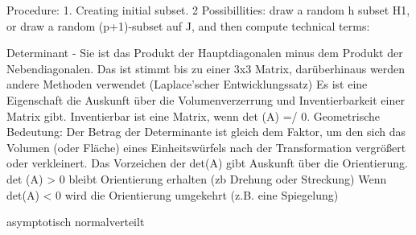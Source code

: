 Procedure: 1. Creating initial subset. 
2 Possibillities: draw a random h subset H1, or draw a random (p+1)-subset auf J, and then compute 
technical terms:


Determinant - Sie ist das Produkt der Hauptdiagonalen minus dem Produkt der Nebendiagonalen. Das ist stimmt bis zu einer 3x3 Matrix, darüberhinaus werden andere Methoden verwendet (Laplace'scher Entwicklungssatz)
Es ist eine Eigenschaft die Auskunft über die Volumenverzerrung und Inventierbarkeit einer Matrix gibt. 
Inventierbar ist eine Matrix, wenn det (A) =/ 0. 
Geometrische Bedeutung:  Der Betrag der Determinante ist gleich dem Faktor, um den sich das Volumen (oder Fläche)  eines Einheitswürfels nach der Transformation vergrößert oder verkleinert.
Das Vorzeichen der det(A) gibt Auskunft über die Orientierung. det (A) > 0 bleibt Orientierung erhalten (zb Drehung oder Streckung)
Wenn det(A) < 0 wird die Orientierung umgekehrt (z.B. eine Spiegelung)


asymptotisch normalverteilt 



